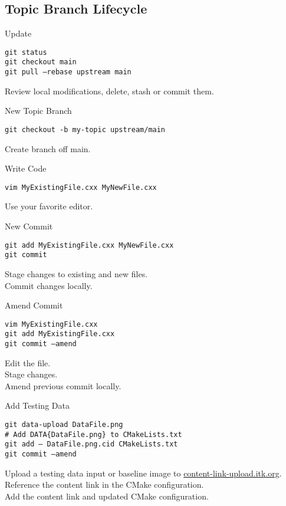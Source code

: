 \documentclass[10pt]{article}
\newlength{\cvsep}
\newlength{\cvtitles}
\newlength{\cvmain}
\newenvironment{category}[1]
  {\parbox[t]{\cvtitles}{\large\sc\centering #1}\hspace*{\cvsep}\begin{minipage}[t]{\cvmain}}
  {\end{minipage}\vspace*{0.35cm}}
\begin{document}
\subsection*{Topic Branch Lifecycle}
\begin{category}{Update}
\parbox[t]{0.6\cvmain}{%
  \texttt{git status\\ git checkout main\\ git pull --rebase upstream main}
}
\parbox[t]{0.38\cvmain}{%
Review local modifications, delete, stash or commit them.
}
\end{category}
\begin{category}{New Topic Branch}
\parbox[t]{0.6\cvmain}{%
  \texttt{git checkout -b my-topic upstream/main}
}
\parbox[t]{0.38\cvmain}{%
Create branch off main.
}
\end{category}
\begin{category}{Write Code}
\parbox[t]{0.6\cvmain}{%
  \texttt{vim MyExistingFile.cxx MyNewFile.cxx}
}
\parbox[t]{0.38\cvmain}{%
Use your favorite editor.
}
\end{category}
\begin{category}{New Commit}
\parbox[t]{0.6\cvmain}{%
  \texttt{git add MyExistingFile.cxx MyNewFile.cxx\\
  git commit}
}
\parbox[t]{0.38\cvmain}{%
Stage changes to existing and new files.\\
Commit changes locally.
}
\end{category}
\begin{category}{Amend Commit}
\parbox[t]{0.6\cvmain}{%
  \texttt{vim MyExistingFile.cxx\\
  git add MyExistingFile.cxx\\
  git commit --amend}
}
\parbox[t]{0.38\cvmain}{%
Edit the file.\\
Stage changes.\\
Amend previous commit locally.
}
\end{category}
\begin{category}{Add Testing Data}
\parbox[t]{0.6\cvmain}{%
  \texttt{git data-upload DataFile.png\\
  \# Add DATA\{DataFile.png\} to CMakeLists.txt\\
  git add -- DataFile.png.cid CMakeLists.txt\\
  git commit --amend}
}
\parbox[t]{0.38\cvmain}{%
Upload a testing data input or baseline image to
  \href{https://content-link-upload.itk.org}{content-link-upload.itk.org}.\\
  Reference the content link in the CMake configuration.\\
  Add the content link and updated CMake configuration.
}
\end{category}
\end{document}
